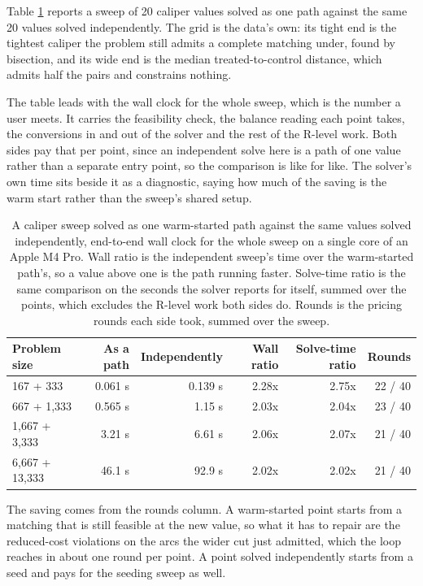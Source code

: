Table \ref{tab:path-table} reports a sweep of 20 caliper values
solved as one path against the same 20 values solved
independently. The grid is the data's own: its tight end is the tightest caliper
the problem still admits a complete matching under, found by bisection, and its
wide end is the median treated-to-control distance, which admits half the pairs
and constrains nothing.

The table leads with the wall clock for the whole sweep, which is the number a user meets. It carries the feasibility check, the balance reading each point
takes, the conversions in and out of the solver and the rest of the R-level
work. Both sides pay that per point, since an independent solve here is a path
of one value rather than a separate entry point, so the comparison is like for
like. The solver's own time sits beside it as a diagnostic, saying how much of
the saving is the warm start rather than the sweep's shared setup.

\begin{table}

\caption{\label{tab:path-table}A caliper sweep solved as one warm-started path against the same values solved independently, end-to-end wall clock for the whole sweep on a single core of an Apple M4 Pro. Wall ratio is the independent sweep's time over the warm-started path's, so a value above one is the path running faster. Solve-time ratio is the same comparison on the seconds the solver reports for itself, summed over the points, which excludes the R-level work both sides do. Rounds is the pricing rounds each side took, summed over the sweep.}
\centering
\begin{tabular}[t]{lrrrrr}
\toprule
Problem size & As a path & Independently & Wall ratio & Solve-time ratio & Rounds\\
\midrule
167 + 333 & 0.061 s & 0.139 s & 2.28x & 2.75x & 22 / 40\\
667 + 1,333 & 0.565 s & 1.15 s & 2.03x & 2.04x & 23 / 40\\
1,667 + 3,333 & 3.21 s & 6.61 s & 2.06x & 2.07x & 21 / 40\\
6,667 + 13,333 & 46.1 s & 92.9 s & 2.02x & 2.02x & 21 / 40\\
\bottomrule
\end{tabular}
\end{table}

The saving comes from the rounds column. A warm-started point starts from a
matching that is still feasible at the new value, so what it has to repair are
the reduced-cost violations on the arcs the wider cut just admitted, which the
loop reaches in about one round per point. A point solved independently starts
from a seed and pays for the seeding sweep as well.

